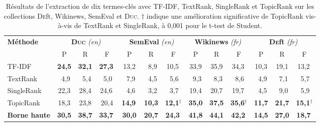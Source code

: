         \begin{table}
          \centering
          \begin{tabular}{l|c@{~~}c@{~~}c@{~}|c@{~~}c@{~~}c@{~}|c@{~~}c@{~~}c@{~}|c@{~~}c@{~~}c@{~}}
            \toprule
            \multirow{2}{*}[-2pt]{\textbf{Méthode}} & \multicolumn{3}{c|}{\textbf{\textsc{Duc}} \textit{(en)}} & \multicolumn{3}{c|}{\textbf{SemEval} \textit{(en)}} & \multicolumn{3}{c|}{\textbf{Wikinews} \textit{(fr)}} & \multicolumn{3}{c}{\textbf{\textsc{De}ft} \textit{(fr)}}\\
            \cline{2-4}\cline{5-7}\cline{8-10}\cline{11-13}
            & P & R & F & P & R & F & P & R & F & P & R & F\\
            \hline
            TF-IDF & \textbf{24,5} & \textbf{32,1} & \textbf{27,3}$^{~}$ & 13,2 & $~~$8,9 & 10,5$^{~}$ & 33,9 & 35,9 & 34,3$^{~}$ & 10,3 & 19,1 & 13,2$^{~}$\\
            TextRank & $~~$4,9 & $~~$5,4 & $~~$5,0$^{~}$ & $~~$7,9 & $~~$4,5 & $~~$5,6$^{~}$ & $~~$9,3 & $~~$8,3 & $~~$8,6$^{~}$ & $~~$4,9 & $~~$7,1 & $~~$5,7$^{~}$\\
            SingleRank & 22,3 & 28,4 & 24,6$^{~}$ & $~~$4,6 & $~~$3,2 & $~~$3,7$^{~}$ & 19,4 & 20,7 & 19,7$^{~}$ & $~~$4,5 & $~~$9,0 & $~~$5,9$^{~}$\\
            TopicRank & 18,3 & 23,8 & 20,4 & \textbf{14,9}$^{~}$ & \textbf{10,3} & \textbf{12,1}$^\dagger$ & \textbf{35,0} & \textbf{37,5} & \textbf{35,6}$^\dagger$ & \textbf{11,7} & \textbf{21,7} & \textbf{15,1}$^\dagger$\\
            \hline
            \textbf{Borne haute} & \textbf{30,5} & \textbf{38,7} & \textbf{33,7}$^{~}$ & \textbf{30,0} & \textbf{20,7} & \textbf{24,3}$^{~}$ & \textbf{41,8} & \textbf{44,1} & \textbf{42,2}$^{~}$ & \textbf{14,5} & \textbf{27,0} & \textbf{18,7}$^{~}$\\
            \bottomrule
          \end{tabular}
          \caption[Résultats de l'extraction de dix termes-clés avec TF-IDF,
                   TextRank, SingleRank et TopicRank sur les collections
                   \textsc{De}ft, Wikinews, SemEval et \textsc{Duc}]{
            Résultats de l'extraction de dix termes-clés avec TF-IDF, TextRank,
            SingleRank et TopicRank sur les collections \textsc{De}ft, Wikinews,
            SemEval et \textsc{Duc}. $\dagger$ indique une amélioration
            significative de TopicRank vis-à-vis de TextRank et SingleRank, à
            0,001 pour le t-test de Student.
            \label{tab:resultats_globaux}
          }
        \end{table}

